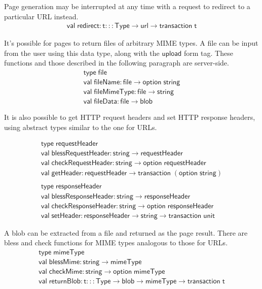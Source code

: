 \documentclass{article}
\newcommand{\mt}[1]{\mathsf{#1}}
\begin{document}
Page generation may be interrupted at any time with a request to redirect to a particular URL instead.
$$\begin{array}{l}
  \mt{val} \; \mt{redirect} : \mt{t} ::: \mt{Type} \to \mt{url} \to \mt{transaction} \; \mt{t}
\end{array}$$

It's possible for pages to return files of arbitrary MIME types.  A file can be input from the user using this data type, along with the $\mt{upload}$ form tag.  These functions and those described in the following paragraph are server-side.
$$\begin{array}{l}
  \mt{type} \; \mt{file} \\
  \mt{val} \; \mt{fileName} : \mt{file} \to \mt{option} \; \mt{string} \\
  \mt{val} \; \mt{fileMimeType} : \mt{file} \to \mt{string} \\
  \mt{val} \; \mt{fileData} : \mt{file} \to \mt{blob}
\end{array}$$

It is also possible to get HTTP request headers and set HTTP response headers, using abstract types similar to the one for URLs.

$$\begin{array}{l}
  \mt{type} \; \mt{requestHeader} \\
  \mt{val} \; \mt{blessRequestHeader} : \mt{string} \to \mt{requestHeader} \\
  \mt{val} \; \mt{checkRequestHeader} : \mt{string} \to \mt{option} \; \mt{requestHeader} \\
  \mt{val} \; \mt{getHeader} : \mt{requestHeader} \to \mt{transaction} \; (\mt{option} \; \mt{string}) \\
  \\
  \mt{type} \; \mt{responseHeader} \\
  \mt{val} \; \mt{blessResponseHeader} : \mt{string} \to \mt{responseHeader} \\
  \mt{val} \; \mt{checkResponseHeader} : \mt{string} \to \mt{option} \; \mt{responseHeader} \\
  \mt{val} \; \mt{setHeader} : \mt{responseHeader} \to \mt{string} \to \mt{transaction} \; \mt{unit}
\end{array}$$

A blob can be extracted from a file and returned as the page result.  There are bless and check functions for MIME types analogous to those for URLs.
$$\begin{array}{l}
  \mt{type} \; \mt{mimeType} \\
  \mt{val} \; \mt{blessMime} : \mt{string} \to \mt{mimeType} \\
  \mt{val} \; \mt{checkMime} : \mt{string} \to \mt{option} \; \mt{mimeType} \\
  \mt{val} \; \mt{returnBlob} : \mt{t} ::: \mt{Type} \to \mt{blob} \to \mt{mimeType} \to \mt{transaction} \; \mt{t}
\end{array}$$
\end{document}
